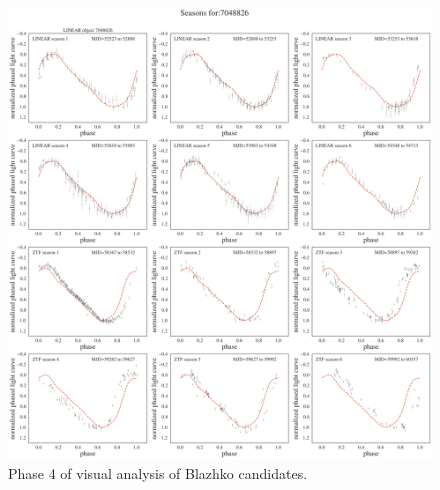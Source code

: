 \begin{figure}[ht]
    \centering
    \includegraphics[width=17cm]{LCplotBySeason7048826.png}
      \caption{Phase 4 of visual analysis of Blazhko candidates.}
      \label{fig:phase4}
\end{figure}
